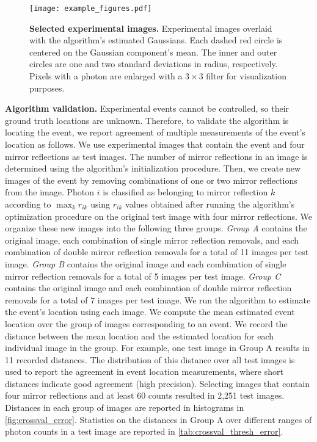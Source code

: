 \begin{figure*}
\centering
\texttt{[image: example\_figures.pdf]}
\caption{\textbf{Selected experimental images.} Experimental images overlaid with the algorithm's estimated Gaussians.
Each dashed red circle is centered on the Gaussian component's mean. 
The inner and outer circles are one and two standard deviations in radius, respectively.
Pixels with a photon are enlarged with a $3 \times 3$ filter for visualization purposes.
} 
\label{fig:example_figures}
\end{figure*}

\noindent
\textbf{Algorithm validation.}
Experimental events cannot be controlled, so their ground truth locations are unknown.
Therefore, to validate the algorithm is locating the event, we report agreement of 
multiple measurements of the event's location as follows.
We use experimental images that contain the event and four mirror reflections as 
test images.
The number of mirror reflections in an image is determined using the algorithm's 
initialization procedure.
Then, we create new images of the event by removing combinations of one or two 
mirror reflections from the image.
Photon $i$ is classified as belonging to mirror reflection $k$ according to 
$\max_k r_{ik}$ using $r_{ik}$ values obtained after running the algorithm's 
optimization procedure on the original test image with four mirror reflections.
We organize these new images into the following three groups.
\emph{Group A} contains the original image, each combination of single mirror 
reflection removals, and each combination of double mirror reflection removals for 
a total of 11 images per test image.
\emph{Group B} contains the original image and each combination of single mirror 
reflection removals for a total of 5 images per test image.
\emph{Group C} contains the original image and each combination of double mirror 
reflection removals for a total of 7 images per test image.
We run the algorithm to estimate the event's location using each image.
We compute the mean estimated event location over the group of images 
corresponding to an event.
We record the distance between the mean location and the estimated location for 
each individual image in the group.
For example, one test image in Group A results in 11 recorded distances.
The distribution of this distance over all test images is used to report the 
agreement in event location measurements, where short distances indicate good 
agreement (high precision).
Selecting images that contain four mirror reflections and at least 60 counts 
resulted in 2,251 test images.
Distances in each group of images are reported in histograms in \cref{fig:crossval_error}.
Statistics on the distances in Group A over different ranges of photon counts in a 
test image are reported in \cref{tab:crossval_thresh_error}.

